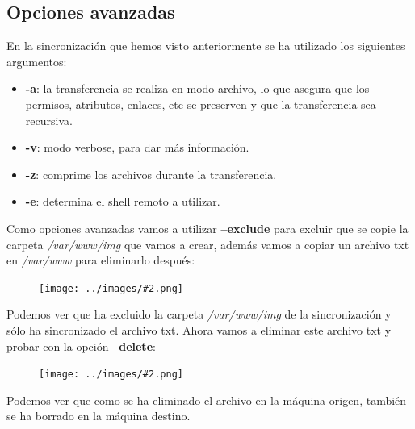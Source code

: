 \documentclass[twoside]{article}
\newcommand{\image}[2]{
\begin{figure}[H]
    \texttt{[image: ../images/\#2.png]}
    \centering
\end{figure}
}
\begin{document}
\subsection{Opciones avanzadas}
En la sincronización que hemos visto anteriormente se ha utilizado los siguientes argumentos:
\begin{itemize}
    \item \textbf{-a}: la transferencia se realiza en modo archivo, lo que asegura que los permisos, atributos, enlaces, etc se preserven y que la transferencia sea recursiva.
    \item \textbf{-v}: modo verbose, para dar más información.
    \item \textbf{-z}: comprime los archivos durante la transferencia.
    \item \textbf{-e}: determina el shell remoto a utilizar.
\end{itemize}
Como opciones avanzadas vamos a utilizar \textbf{--exclude} para excluir que se copie la carpeta \textit{/var/www/img} que vamos a crear, además vamos a copiar un archivo txt en \textit{/var/www} para eliminarlo después:
\image{8}{10}
Podemos ver que ha excluido la carpeta \textit{/var/www/img} de la sincronización y sólo ha sincronizado el archivo txt. Ahora vamos a eliminar este archivo txt y probar con la opción \textbf{--delete}:
\image{8}{11}
Podemos ver que como se ha eliminado el archivo en la máquina origen, también se ha borrado en la máquina destino.




























\iffalse
\end{document}
